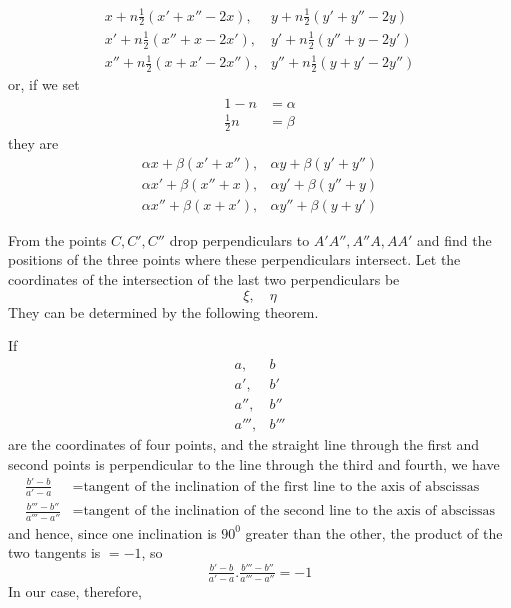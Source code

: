 %
\[
\begin{array}{ll}
x+n\tfrac12(x'+x''-2x),&y+n\tfrac12(y'+y''-2y)\\
x'+n\tfrac12(x''+x-2x'),&y'+n\tfrac12(y''+y-2y')\\
x''+n\tfrac12(x+x'-2x''),&y''+n\tfrac12(y+y'-2y'')
\end{array}
\]
or, if we set
\[
\begin{aligned}1-n&=\alpha\\\tfrac12n&=\beta\end{aligned}
\]
they are
\[
\begin{array}{ll}
\alpha x+\beta(x'+x''),&\alpha y+\beta(y'+y'')\\
\alpha x'+\beta(x''+x),&\alpha y'+\beta(y''+y)\\
\alpha x''+\beta(x+x'),&\alpha y''+\beta(y+y')
\end{array}
\]
\par
From the points \(C,C',C''\) drop perpendiculars to \(A'A'',A''A,AA'\) and find the positions of the three points where these perpendiculars intersect. Let the coordinates of the intersection of the last two perpendiculars be
\[
\xi,\quad\eta
\]
They can be determined by the following theorem.

If
\[
\begin{array}{ll}
a,&b\\a',&b'\\a'',&b''\\a''',&b'''
\end{array}
\]
are the coordinates of four points, and the straight line through the first and second points is perpendicular to the line through the third and fourth, we have
\begingroup\small
\[
\begin{aligned}
\tfrac{b'-b}{a'-a}&=\text{tangent of the inclination of the first line to the axis of abscissas}\\
\tfrac{b'''-b''}{a'''-a''}&=\text{tangent of the inclination of the second line to the axis of abscissas}
\end{aligned}
\]
\endgroup
and hence, since one inclination is \(90^0\) greater than the other, the product of the two tangents is \(=-1\), so
\[
\tfrac{b'-b}{a'-a}.\tfrac{b'''-b''}{a'''-a''}=-1
\]
In our case, therefore,
